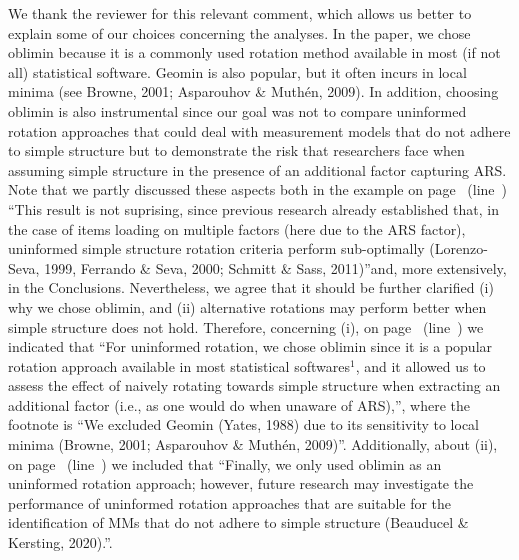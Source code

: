 \documentclass[a4paper]{article}
\begin{document}
We thank the reviewer for this relevant comment, which allows us better to explain some of our choices concerning the analyses. In the paper, we chose oblimin because it is a commonly used rotation method available in most (if not all) statistical software. Geomin is also popular, but it often incurs in local minima (see Browne, 2001; Asparouhov
\& Muthén, 2009). 
In addition, choosing oblimin is also instrumental since our goal was not to compare uninformed rotation approaches that could deal with measurement models that do not adhere to simple structure but to demonstrate the risk that researchers face when assuming simple structure in the presence of an additional factor capturing ARS. Note that we partly discussed these aspects both in the example on page~\pageref{refpage:R1Mj2c} (line~) \textquotedblleft This result is not suprising, since previous research already established that, in the case of items loading on multiple factors (here due to the ARS factor), uninformed simple structure rotation criteria perform sub-optimally (Lorenzo-Seva, 1999, Ferrando \& Seva, 2000; Schmitt \& Sass, 2011)\textquotedblright and, more extensively, in the Conclusions. Nevertheless, we agree that it should be further clarified (i) why we chose oblimin, and (ii) alternative rotations may perform better when simple structure does not hold. Therefore, concerning (i), on page~\pageref{refpage:R1Mj2a} (line~) we indicated that \textquotedblleft For uninformed rotation, we chose oblimin since it is a popular rotation approach available in most statistical softwares$^{1}$, and it allowed us to assess the effect of naively rotating towards simple structure when extracting an additional factor (i.e., as one would do when unaware of ARS),\textquotedblright, where the footnote is \textquotedblleft We excluded Geomin (Yates, 1988) due to its sensitivity to local minima (Browne, 2001; Asparouhov
\& Muthén, 2009)\textquotedblright.  Additionally, about (ii), on page~\pageref{refpage:R1Mj2a} (line~) we included that \textquotedblleft Finally, we only used oblimin as an uninformed rotation approach; however, future research may investigate the performance of uninformed rotation approaches that are suitable for the identification of MMs that do not adhere to simple structure (Beauducel \& Kersting, 2020).\textquotedblright.

\end{document}
